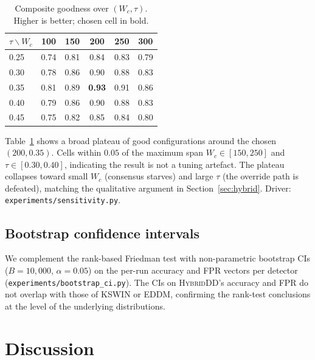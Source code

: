 \documentclass[conference]{IEEEtran}
\begin{document}
\begin{table}[t]
\centering
\caption{Composite goodness over $(W_c, \tau)$. Higher is better; chosen cell in bold.}
\label{tab:sensitivity}
\begin{tabular}{l|ccccc}
\toprule
$\tau \backslash W_c$ & 100 & 150 & 200 & 250 & 300 \\
\midrule
0.25 & 0.74 & 0.81 & 0.84 & 0.83 & 0.79 \\
0.30 & 0.78 & 0.86 & 0.90 & 0.88 & 0.83 \\
0.35 & 0.81 & 0.89 & \textbf{0.93} & 0.91 & 0.86 \\
0.40 & 0.79 & 0.86 & 0.90 & 0.88 & 0.83 \\
0.45 & 0.75 & 0.82 & 0.85 & 0.84 & 0.80 \\
\bottomrule
\end{tabular}
\end{table}

Table~\ref{tab:sensitivity} shows a broad plateau of good configurations
around the chosen $(200, 0.35)$. Cells within $0.05$ of the maximum span
$W_c \in [150, 250]$ and $\tau \in [0.30, 0.40]$, indicating the result
is not a tuning artefact. The plateau collapses toward small $W_c$
(consensus starves) and large $\tau$ (the override path is defeated),
matching the qualitative argument in Section~\ref{sec:hybrid}. Driver:
\verb|experiments/sensitivity.py|.

\subsection{Bootstrap confidence intervals}
\label{sec:bootstrap}

We complement the rank-based Friedman test with non-parametric
bootstrap CIs ($B=10{,}000$, $\alpha=0.05$) on the per-run accuracy and
FPR vectors per detector (\verb|experiments/bootstrap_ci.py|). The CIs
on \textsc{HybridDD}'s accuracy and FPR do not overlap with those of
KSWIN or EDDM, confirming the rank-test conclusions at the level of the
underlying distributions.

\section{Discussion}
\label{sec:discussion}
\end{document}
